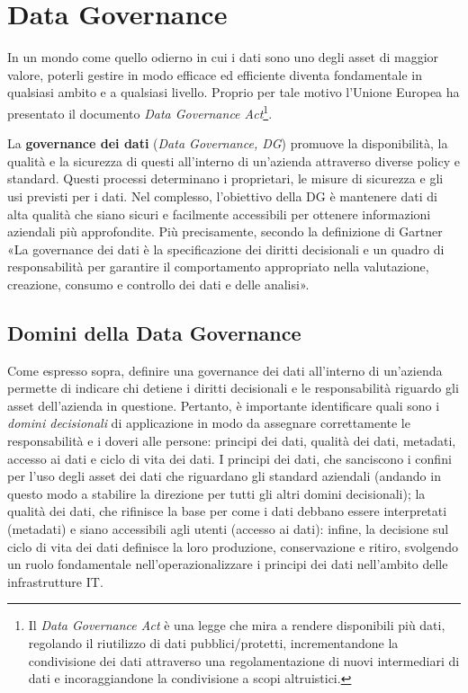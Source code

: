 \section{Data Governance}
In un mondo come quello odierno in cui i dati sono uno degli asset di maggior valore, poterli gestire in modo efficace ed efficiente diventa fondamentale in qualsiasi ambito e a qualsiasi livello. Proprio per tale motivo l'Unione Europea ha presentato il documento \textit{Data Governance Act}\footnote{Il \textit{Data Governance Act} è una legge che mira a rendere disponibili più dati, regolando il riutilizzo di dati pubblici/protetti, incrementandone la condivisione dei dati attraverso una regolamentazione di nuovi intermediari di dati e incoraggiandone la condivisione a scopi altruistici.}.\cite{europe_data_governance_act}

La \textbf{governance dei dati} (\textit{Data Governance, DG}) promuove la disponibilità, la qualità e la sicurezza di questi all'interno di un'azienda attraverso diverse policy e standard. Questi processi determinano i proprietari, le misure di sicurezza e gli usi previsti per i dati. Nel complesso, l'obiettivo della DG è mantenere dati di alta qualità che siano sicuri e facilmente accessibili per ottenere informazioni aziendali più approfondite.\cite{ibm_data_governance}
Più precisamente, secondo la definizione di Gartner «La governance dei dati è la specificazione dei diritti decisionali e un quadro di responsabilità per garantire il comportamento appropriato nella valutazione, creazione, consumo e controllo dei dati e delle analisi».\cite{gartner_data_governance_definition}

\subsection{Domini della Data Governance}
Come espresso sopra, definire una governance dei dati all'interno di un'azienda permette di indicare chi detiene i diritti decisionali e le responsabilità riguardo gli asset dell'azienda in questione. Pertanto, è importante identificare quali sono i \textit{domini decisionali} di applicazione in modo da assegnare correttamente le responsabilità e i doveri alle persone: principi dei dati, qualità dei dati, metadati, accesso ai dati e ciclo di vita dei dati. I principi dei dati, che sanciscono i confini per l'uso degli asset dei dati che riguardano gli standard aziendali (andando in questo modo a stabilire la direzione per tutti gli altri domini decisionali); la qualità dei dati, che rifinisce la base per come i dati debbano essere interpretati (metadati) e siano accessibili agli utenti (accesso ai dati): infine, la decisione sul ciclo di vita dei dati definisce la loro produzione, conservazione e ritiro, svolgendo un ruolo fondamentale nell'operazionalizzare i principi dei dati nell'ambito delle infrastrutture IT.\cite{data_governance_activities}

